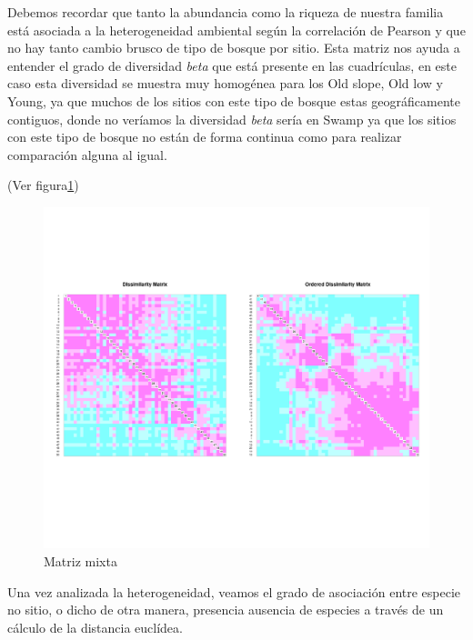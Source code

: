 \documentclass[11pt,]{article}
\begin{document}
Debemos recordar que tanto la abundancia como la riqueza de nuestra
familia está asociada a la heterogeneidad ambiental según la correlación
de Pearson y que no hay tanto cambio brusco de tipo de bosque por sitio.
Esta matriz nos ayuda a entender el grado de diversidad \emph{beta} que
está presente en las cuadrículas, en este caso esta diversidad se
muestra muy homogénea para los Old slope, Old low y Young, ya que muchos
de los sitios con este tipo de bosque estas geográficamente contiguos,
donde no veríamos la diversidad \emph{beta} sería en Swamp ya que los
sitios con este tipo de bosque no están de forma continua como para
realizar comparación alguna al igual.

(Ver figura\ref{fig:punt_z})

\begin{figure}
\centering
\includegraphics{punt_z.png}
\caption{\label{fig:punt_z}Matriz mixta}
\end{figure}

Una vez analizada la heterogeneidad, veamos el grado de asociación entre
especie no sitio, o dicho de otra manera, presencia ausencia de especies
a través de un cálculo de la distancia euclídea.
\end{document}
